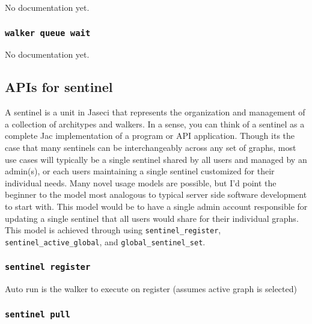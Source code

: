 {No documentation yet.}
\subsubsection{\lstinline[basicstyle=\Large\ttfamily]$walker queue wait$}

{No documentation yet.}
\subsection{APIs for sentinel}

\par
A sentinel is a unit in Jaseci that represents the organization and management of
a collection of architypes and walkers. In a sense, you can think of a sentinel
as a complete Jac implementation of a program or API application. Though its the
case that many sentinels can be interchangeably across any set of graphs, most
use cases will typically be a single sentinel shared by all users and managed by an
admin(s), or each users maintaining a single sentinel customized for their
individual needs. Many novel usage models are possible, but I'd point the beginner
to the model most analogous to typical server side software development to start
with. This model would be to have a single admin account responsible for updating
a single sentinel that all users would share for their individual graphs. This
model is achieved through using \texttt{sentinel\_register},
\texttt{sentinel\_active\_global}, and \texttt{global\_sentinel\_set}.

\subsubsection{\lstinline[basicstyle=\Large\ttfamily]$sentinel register$}

{Auto run is the walker to execute on register (assumes active graph
is selected)}
\subsubsection{\lstinline[basicstyle=\Large\ttfamily]$sentinel pull$}

